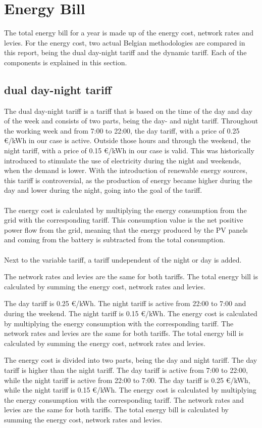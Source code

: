 
\section{Energy Bill}
\label{sec:energy-bill}
The total energy bill for a year is made up of the energy cost, network rates and levies. For the energy cost, two actual Belgian methodologies are compared in this report, being the dual day-night tariff and the dynamic tariff. Each of the components is explained in this section. 

\subsection{dual day-night tariff}
\label{sec:dual-day-night}
The dual day-night tariff is a tariff that is based on the time of the day and day of the week and consists of two parts, being the day- and night tariff. Throughout the working week and from 7:00 to 22:00, the day tariff, with a price of 0.25 \euro/kWh in our case is active. Outside those hours and through the weekend, the night tariff, with a price of 0.15 \euro/kWh in our case is valid. This was historically introduced to stimulate the use of electricity during the night and weekends, when the demand is lower. With the introduction of renewable energy sources, this tariff is controversial, as the production of energy became higher during the day and lower during the night, going into the goal of the tariff.
\\ \\
The energy cost is calculated by multiplying the energy consumption from the grid with the corresponding tariff. This consumption value is the net positive power flow from the grid, meaning that the energy produced by the PV panels and coming from the battery is subtracted from the total consumption.
\\ \\
Next to the variable tariff, a tariff undependent of the night or day is added. 


The network rates and levies are the same for both tariffs. The total energy bill is calculated by summing the energy cost, network rates and levies. 

The day tariff is 0.25 \euro/kWh. The night tariff is active from 22:00 to 7:00 and during the weekend. The night tariff is 0.15 \euro/kWh. The energy cost is calculated by multiplying the energy consumption with the corresponding tariff. The network rates and levies are the same for both tariffs. The total energy bill is calculated by summing the energy cost, network rates and levies.


The energy cost is divided into two parts, being the day and night tariff. The day tariff is higher than the night tariff. The day tariff is active from 7:00 to 22:00, while the night tariff is active from 22:00 to 7:00. The day tariff is 0.25 \euro/kWh, while the night tariff is 0.15 \euro/kWh. The energy cost is calculated by multiplying the energy consumption with the corresponding tariff. The network rates and levies are the same for both tariffs. The total energy bill is calculated by summing the energy cost, network rates and levies.